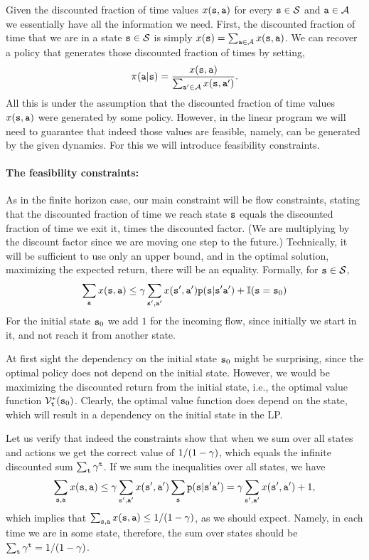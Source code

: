 
Given the discounted fraction of time values  $x({\tt s},{\tt a})$ for every ${\tt s}\in\mathcal{S}$ and ${\tt a}\in\mathcal{A}$ we essentially have all the information we need. First, the discounted fraction of time that we are in a state ${\tt s}\in\mathcal{S}$ is simply $x({\tt s})=\sum_{{\tt a}\in\mathcal{A}}x({\tt s},{\tt a})$.
We can recover a policy that generates those discounted fraction of times by setting,
\[
\pi({\tt a}|{\tt s})=\frac{x({\tt s},{\tt a})}{\sum_{{\tt a}'\in\mathcal{A}}x({\tt s},{\tt a}')}.
\]
All this is under the assumption that the discounted fraction of time values $x({\tt s},{\tt a})$ were generated by some policy. However, in the linear program we will need to guarantee that indeed those values are feasible, namely, can be generated by the given dynamics. For this we will introduce feasibility constraints.

\paragraph{The feasibility constraints:}
As in the finite horizon case, our main constraint will be flow constraints, stating that the discounted fraction of time we reach state ${\tt s}$ equals the discounted fraction of time we exit it, times the discounted factor. (We are multiplying by the discount factor since we are moving one step to the future.) Technically, it will be sufficient to use only an upper bound, and in the optimal solution, maximizing the expected return, there will be an equality. Formally, for ${\tt s}\in\mathcal{S}$,
\[
\sum_{{\tt a}} x({\tt s},{\tt a})\leq \gamma
\sum_{{\tt s}',{\tt a}'}
x({\tt s}',{\tt a}'){\tt p}({\tt s}|{\tt s}'{\tt a}')+\mathbb{I}({\tt s}={\tt s}_0)
\]
For the initial state ${\tt s}_0$ we add $1$ for the incoming flow, since initially we start in it, and not reach it from another state.

At first sight the dependency on the initial state ${\tt s}_0$ might be surprising, since the optimal policy does not depend on the initial state. However, we would be maximizing the discounted return from the initial state, i.e., the optimal value function $\mathcal{V}^*_{\tt t}({\tt s}_0)$. Clearly, the optimal value function does depend on the state, which will result in a dependency on the initial state in the LP.

Let us verify that indeed the constraints show that when we sum over all states and actions  we get the correct value of $1/(1-\gamma)$, which equals the infinite discounted sum $\sum_{\tt t}\gamma^{\tt t}$.
If we sum the inequalities over all states, we have
\[
\sum_{{\tt s},{\tt a}} x({\tt s},{\tt a})\leq\gamma
\sum_{{\tt s}',{\tt a}'} x({\tt s}',{\tt a}')\sum_{\tt s}
{\tt p}({\tt s}|{\tt s}'{\tt a}')=\gamma \sum_{{\tt s}',{\tt a}'}
x({\tt s}',{\tt a}')+1,\]
%
which implies that $\sum_{{\tt s},{\tt a}} x({\tt s},{\tt a})\leq
1/(1-\gamma)$, as we should expect. Namely, in each time we are
in some state, therefore, the sum over states should be $\sum_{\tt t}
\gamma^{\tt t}=1/(1-\gamma)$.

